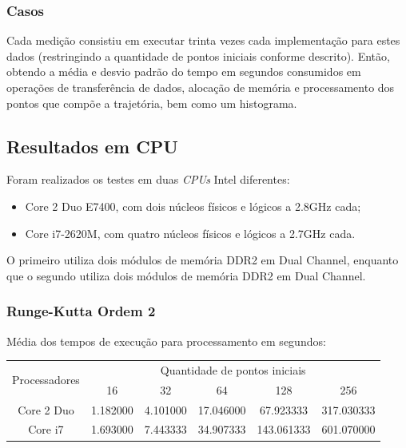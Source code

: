     \subsubsection{Casos}
    Cada medição consistiu em executar trinta vezes cada implementação para estes dados (restringindo a quantidade de pontos iniciais conforme descrito). Então, obtendo a média e desvio padrão do tempo em segundos consumidos em operações de transferência de dados, alocação de memória e processamento dos pontos que compõe a trajetória, bem como um histograma.

  \subsection{Resultados em CPU}
  Foram realizados os testes em duas \textit{CPUs} Intel diferentes:
  \begin{itemize}
    \item Core 2 Duo E7400, com dois núcleos físicos e lógicos a 2.8GHz cada;
    \item Core i7-2620M, com quatro núcleos físicos e lógicos a 2.7GHz cada.
  \end{itemize}
  
  O primeiro utiliza dois módulos de memória DDR2 em Dual Channel, enquanto que o segundo utiliza dois módulos de memória DDR2 em Dual Channel.
    \subsubsection{Runge-Kutta Ordem 2}
    Média dos tempos de execução para processamento em segundos:\\
    \begin{tabular}{| c | c | c | c | c | c |}
      \hline
      \multirow{2}{*}{Processadores}& \multicolumn{5}{|c|}{Quantidade de pontos iniciais} \\ \cline{2-6}
      & 16 & 32 & 64 & 128 & 256 \\ \hline
      Core 2 Duo & 1.182000 & 4.101000 & 17.046000 & 67.923333 & 317.030333 \\ \hline
      Core i7 & 1.693000 & 7.443333 & 34.907333 & 143.061333 & 601.070000\\ \hline

      \hline
    \end{tabular}
    
    \hspace{1mm}\newline
    
